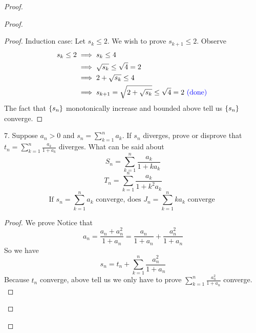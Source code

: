 \documentclass{report}
\begin{document}
\begin{proof}
\begin{proof}
\begin{proof}
Induction case: Let $s_k\leq 2$. We wish to prove  $s_{k+1}\leq 2$. Observe
\begin{align}
  s_k\leq 2&\implies s_k\leq 4\\
  &\implies \sqrt{s_k}\leq \sqrt{4} =2\\
  &\implies 2+\sqrt{s_k} \leq 4\\
  &\implies s_{k+1}=\sqrt{2+\sqrt{s_k} }\leq \sqrt{4}=2 \textcolor{blue}{\text{ (done) }}
\end{align}
The fact that $\{ s_n \}$ monotonically increase and bounded above tell us $\{ s_n \}$ converge.
\end{proof}
\begin{question}{}{}
7. Suppose $a_n > 0$ and $s_n = \sum _{k=1}^{n} a_k$. If $s_n$ diverges, prove or disprove that $t_n=\sum_{k=1}^{n} \frac{a_k}{1+a_k}$ diverges. What can be said about
\begin{equation}
S_n=\sum_{k=1}^n \frac{a_k}{1+ka_k}
\end{equation}
\begin{equation}
T_n=\sum_{k=1}^n \frac{a_k}{1+k^2a_k}
\end{equation}
\begin{equation}
\text{If } s_n=\sum_{k=1}^n a_k\text{ converge, does }J_n=\sum_{k=1}^n ka_k\text{ converge }
\end{equation}
\end{question}
\begin{proof}
  We prove 
Notice that
\begin{equation}
a_n=\frac{a_n+a_n^2}{1+a_n}=\frac{a_n}{1+a_n}+\frac{a_n^2}{1+a_n}
\end{equation}
So we have
\begin{equation}
s_n=t_n+\sum_{k=1}^n \frac{a_n^2}{1+a_n}
\end{equation}
Because $t_n$ converge, above tell us we only have to prove  $\sum_{k=1}^n \frac{a_n^2}{1+a_n}$ converge.\\


\end{proof}
\end{proof}
\end{proof}
\end{document}
